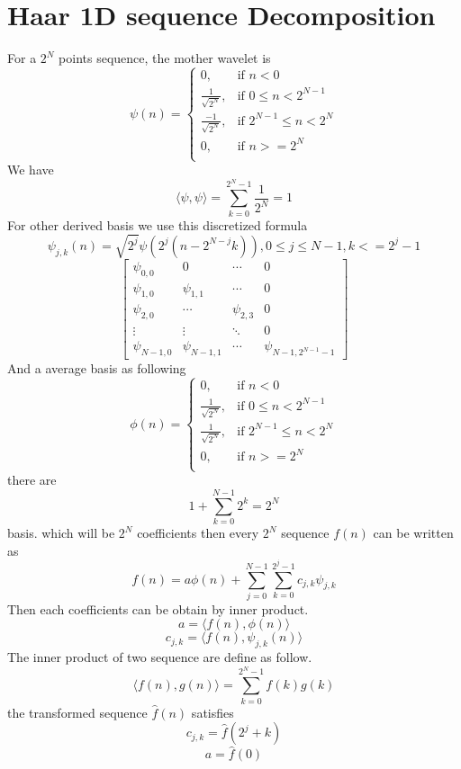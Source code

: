 \documentclass{article}
\theoremstyle{definition} %
\begin{document}
\section{Haar 1D sequence Decomposition}\label{sec:Haar2}
For a \(2^{N}\) points sequence, the mother
wavelet is
\[
    \psi(n) =
    \begin{cases}
        0,                     & \text{if } n < 0               \\
        \frac{1}{\sqrt{2^N}},  & \text{if } 0\leq n < 2^{N-1}   \\
        \frac{-1}{\sqrt{2^N}}, & \text{if } 2^{N-1}\leq n<2^{N} \\
        0,                     & \text{if } n >= 2^N            \\
    \end{cases}
\]
We have
\[
    \langle\psi,\psi\rangle=\sum_{k=0}^{2^N-1}\frac{1}{2^N}=1
\]
For other derived basis we use
this discretized formula
\[
    \psi_{j,k}(n)=\sqrt{2^j}\psi(2^j(n-2^{N-j}k)) , 0\leq j\leq N-1
    , k<=2^j-1
\]
\[
    \left[
        \begin{array}{cccc}
            \psi_{0,0}   & 0            & \cdots     & 0                    \\
            \psi_{1,0}   & \psi_{1,1}   & \cdots     & 0                    \\
            \psi_{2,0}   & \cdots       & \psi_{2,3} & 0                    \\
            \vdots       & \vdots       & \ddots     & 0                    \\
            \psi_{N-1,0} & \psi_{N-1,1} & \cdots     & \psi_{N-1,2^{N-1}-1}
        \end{array}
        \right]
\]
And a average basis as following
\[
    \phi(n) =
    \begin{cases}
        0,                    & \text{if } n < 0               \\
        \frac{1}{\sqrt{2^N}}, & \text{if } 0\leq n < 2^{N-1}   \\
        \frac{1}{\sqrt{2^N}}, & \text{if } 2^{N-1}\leq n<2^{N} \\
        0,                    & \text{if } n >= 2^N            \\
    \end{cases}
\]
there are
\[
    1+\sum_{k=0}^{N-1}2^k=2^N
\]
basis.
which will be \(2^N\) coefficients
then every \(2^N\) sequence \(f(n)\) can be written as
\[
    f(n)=a\phi(n)+\sum_{j=0}^{N-1}\sum_{k=0}^{2^j-1}c_{j,k}\psi_{j,k}
\]
Then each coefficients can be obtain by inner product.
\[
    a=\langle f(n),\phi(n)\rangle
\]
\[
    c_{j,k}=\langle f(n),\psi_{j,k}(n)\rangle
\]
The inner product of two sequence are define as follow.
\[
    \langle f(n),g(n)\rangle=\sum_{k=0}^{2^N-1}f(k)g(k)
\]
the transformed sequence \(\hat{f}(n)\)
satisfies
\[
    c_{j,k}=\hat{f}(2^j+k)
\]
\[
    a=\hat{f}(0)
\]
\end{document}
